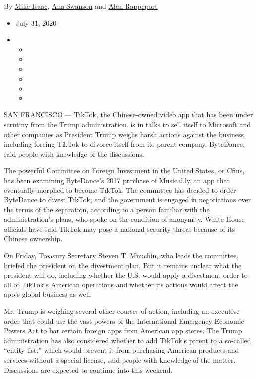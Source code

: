 By \href{https://www.nytimes.com/by/mike-isaac}{Mike Isaac},
\href{https://www.nytimes.com/by/ana-swanson}{Ana Swanson} and
\href{https://www.nytimes.com/by/alan-rappeport}{Alan Rappeport}

\begin{itemize}
\item
  July 31, 2020
\item
  \begin{itemize}
  \item
  \item
  \item
  \item
  \item
  \item
  \end{itemize}
\end{itemize}

SAN FRANCISCO --- TikTok, the Chinese-owned video app that has been
under scrutiny from the Trump administration, is in talks to sell itself
to Microsoft and other companies as President Trump weighs harsh actions
against the business, including forcing TikTok to divorce itself from
its parent company, ByteDance, said people with knowledge of the
discussions.

The powerful Committee on Foreign Investment in the United States, or
Cfius, has been examining ByteDance's 2017 purchase of Musical.ly, an
app that eventually morphed to become TikTok. The committee has decided
to order ByteDance to divest TikTok, and the government is engaged in
negotiations over the terms of the separation, according to a person
familiar with the administration's plans, who spoke on the condition of
anonymity. White House officials have said TikTok may pose a national
security threat because of its Chinese ownership.

On Friday, Treasury Secretary Steven T. Mnuchin, who leads the
committee, briefed the president on the divestment plan. But it remains
unclear what the president will do, including whether the U.S. would
apply a divestment order to all of TikTok's American operations and
whether its actions would affect the app's global business as well.

Mr. Trump is weighing several other courses of action, including an
executive order that could use the vast powers of the International
Emergency Economic Powers Act to bar certain foreign apps from American
app stores. The Trump administration has also considered whether to add
TikTok's parent to a so-called ``entity list,'' which would prevent it
from purchasing American products and services without a special
license, said people with knowledge of the matter. Discussions are
expected to continue into this weekend.

